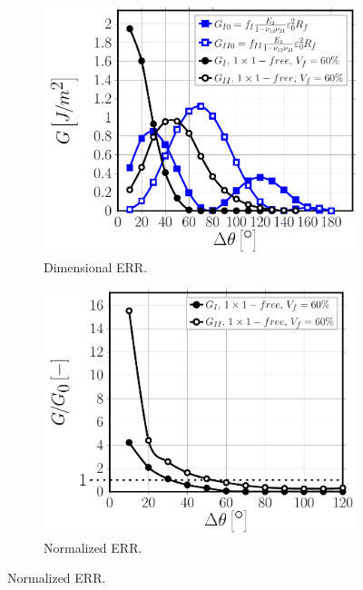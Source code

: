 \documentclass[review]{elsarticle}
\begin{document}
\begin{figure}[!h]
\centering
    \begin{subfigure}[b]{0.475\textwidth}
        \includegraphics[height=0.225\textheight]{comparescaling-Vf60.pdf}
        \caption{Dimensional ERR.}\label{subfig:comparescalingVf60}
    \end{subfigure} \quad
    \begin{subfigure}[b]{0.475\textwidth}
        \includegraphics[height=0.225\textheight]{comparescaling-Vf60-normalized.pdf}
        \caption{Normalized ERR.}\label{subfig:comparescalingVf60normalized}
    \end{subfigure}


\end{figure}
\end{document}
